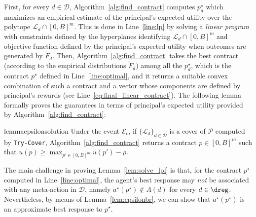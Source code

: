 %
First, for every $d \in \mathcal{D}$, Algorithm~\ref{alg:find_contract} computes $p_d^\star$ which maximizes an empirical estimate of the principal's expected utility over the polytope $\mathcal{L}_d \cap [0,B]^m$.
%
This is done in Line~\ref{line:lp} by solving a \emph{linear program} with constraints defined by the hyperplanes identifying $\mathcal{L}_d \cap [0,B]^m$ and objective function defined by the principal's expected utility when outcomes are generated by $\widetilde{F}_d$.
%
Then, Algorithm~\ref{alg:find_contract} takes the best contract (according to the empirical distributions $\widetilde{F}_d$) among all the $p_d^\star$, which is the contract $p^\star$ defined in Line~\ref{line:optimal}, and it returns a suitable convex combination of such a contract and a vector whose components are defined by principal's rewards (see Line~\ref{eq:final_linear_contract}). 
The following lemma formally proves the guarantees in terms of principal's expected utility provided by Algorithm~\ref{alg:find_contract}:
%
\begin{restatable}{lemma}{epsilonsolution}\label{lem:solve_lpl}
	Under the event $\mathcal{E}_\epsilon$, if $\{ \mathcal{L}_d\}_{d \in \mathcal{D}}$ is a cover of $\mathcal{P}$ computed by \textnormal{\texttt{Try-Cover}}, Algorithm~\ref{alg:find_contract} returns a contract $p \in [0,B]^m$ such that $u(p) \geq \max_{p' \in [0,B]^m} u(p') - \rho$.
\end{restatable}
%
The main challenge in proving Lemma~\ref{lem:solve_lpl} is that, for the contract $p^\star$ computed in Line~\ref{line:optimal}, the agent's best response may \emph{not} be associated with any meta-action in $\mathcal{D}$, namely $a^\star(p^\star) \not \in A(d)$ for every $d \in \dreg$.
%
Nevertheless, by means of Lemma~\ref{lem:epsilonbr}, we can show that $a^\star(p^\star)$ is an approximate best response to $p^\star$.
